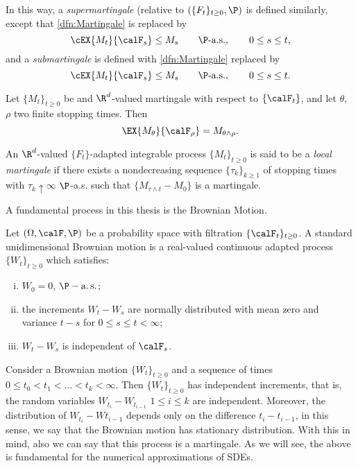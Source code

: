 	In this way, a \emph{supermartingale} (relative to $\left(\{F_t \}_{t\geq 0}, \P \right)$ is defined similarly, 
except that \eqref{dfn:Martingale} is replaced by
$$
	\cEX{M_t}{\calF_s}\leq M_s
	\qquad \P\text{-a.s.},
	\qquad 0\leq s \leq t, 
$$ and a \emph{submartingale} is defined with \eqref{dfn:Martingale} 
replaced by
$$
	\cEX{M_t}{\calF_s} \leq M_s
	\qquad \P\text{-a.s.},
	\qquad 0\leq s \leq t.
$$ 
\begin{thm}
	Let $\{M_t\}_{t\geq 0}$ be and $\R^d$-valued martingale with respect to $\{\calF_t\}$, and let $\theta$, $\rho$ two 
	finite stopping times. Then 
	$$
		\EX{M_{\theta}}{\calF_{\rho}}= M_{\theta \wedge\rho}.
	$$
\end{thm}
\begin{definition}
	An $\R^d$-valued $\{F_t\}$-adapted integrable process $\{M_t\}_{t\geq 0}$ is said to be a \emph{local martingale}
	if there exists a nondecreasing sequence $\{\tau_k\}_{k\geq 1}$ of stopping times with $\tau_k \uparrow \infty$
	$\P$-a.s. such that $\{M_{\tau\wedge t} - M_0 \}$ is a martingale.
\end{definition}
A fundamental process in this thesis is the Brownian Motion.
\begin{definition}
	Let $(\Omega, \calF, \P)$ be a probability space with filtration $\{\calF_t\}_{t\geq 0}$. A standard unidimensional
	Brownian motion is a real-valued continuous adapted process $\{W_t\}_{t\geq 0}$ which satisfies:
	\begin{enumerate}[(i)]
		\item 
			$W_0=0$, \qquad $\P-\as$;
		\item 
			the increments $W_t-W_s$ are normally distributed with mean zero and variance $t-s$ for 
			$0\leq s\leq t<\infty$;
		\item
			$W_t-W_s$ is independent of $\calF_s$.
	\end{enumerate}
\end{definition}

	Consider a Brownian motion $\{W_t\}_{t\geq 0}$  and a sequence of times $0 \leq t_0 < t_1 < \ldots < t_k < \infty$.
Then $\{W_t\}_{t\geq 0}$ has independent increments, that is, the random variables $W_{t_i}-W_{t_{i-1}}$ 
$1\leq i \leq k $ are independent. Moreover, the distribution of $W_{t_i} - W{t_{i-1}}$ depends only on the 
difference $t_i - t_{i-1}$, in this sense, we say that the Brownian motion has stationary distribution. With this in
mind, also we can say that this process is a martingale. As we will see, the above is fundamental for the numerical 
approximations of SDEs.
%
